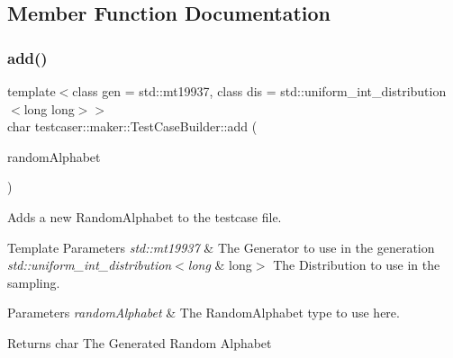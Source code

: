 \subsection{Member Function Documentation}
\mbox{\label{classtestcaser_1_1maker_1_1TestCaseBuilder_a26c5a045c2b1c4db64f4542aaee326aa}} 
\subsubsection{\texorpdfstring{add()}{add()}\hspace{0.1cm}{\footnotesize\ttfamily [1/11]}}
{\footnotesize\ttfamily template$<$class gen  = std\+::mt19937, class dis  = std\+::uniform\+\_\+int\+\_\+distribution$<$long long$>$$>$ \\
char testcaser\+::maker\+::\+Test\+Case\+Builder\+::add (\begin{DoxyParamCaption}\item[{\hyperlink{classtestcaser_1_1maker_1_1types_1_1RandomAlphabet}{types\+::\+Random\+Alphabet}$<$ gen, dis $>$ \&}]{random\+Alphabet }\end{DoxyParamCaption})\hspace{0.3cm}{\ttfamily [inline]}}



Adds a new Random\+Alphabet to the testcase file. 


\begin{DoxyTemplParams}{Template Parameters}
{\em std\+::mt19937} & The Generator to use in the generation \\
\hline
{\em std\+::uniform\+\_\+int\+\_\+distribution$<$long} & long$>$ The Distribution to use in the sampling. \\
\hline
\end{DoxyTemplParams}

\begin{DoxyParams}{Parameters}
{\em random\+Alphabet} & The Random\+Alphabet type to use here. \\
\hline
\end{DoxyParams}
\begin{DoxyReturn}{Returns}
char The Generated Random Alphabet 
\end{DoxyReturn}
\mbox{\label{classtestcaser_1_1maker_1_1TestCaseBuilder_a0666074618ac122218a4206b5952ca07}} 

